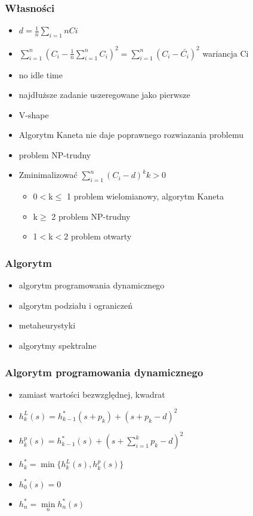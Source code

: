 \documentclass[12pt,a4paper]{article}
\begin{document}
\subsubsection{Własności}
\begin{itemize}
\item $d=\frac{1}{n}\sum\limits_{i=1}{n}Ci$
\item $\sum\limits_{i=1}^{n}(C_{i}-\frac{1}{n}\sum\limits_{i=1}^{n}C_{i})^2 = \sum\limits_{i=1}^{n}(C_{i}- \bar{C_{i}})^2$ wariancja Ci
\item no idle time
\item najdłuższe zadanie uszeregowane jako pierwsze
\item V-shape
\item Algorytm Kaneta nie daje poprawnego rozwiazania problemu
\item problem NP-trudny
\item Zminimalizować $\sum\limits_{i=1}^{n}(C_{i}-d)^k k>0$
\begin{itemize}
\item 0$<$k$\leq$ 1 problem wielomianowy, algorytm Kaneta
\item k$\geq$ 2 problem NP-trudny
\item 1$<$k$<$2 problem otwarty
\end{itemize}
\end{itemize}
\subsubsection{Algorytm}
\begin{itemize}
\item algorytm programowania dynamicznego
\item algorytm podziału i ograniczeń
\item metaheurystyki
\item algorytmy spektralne 
\end{itemize}
\subsubsection{Algorytm programowania dynamicznego}
\begin{itemize}
\item zamiast wartości bezwzględnej, kwadrat
\item $h_{k}^{L}(s)= h_{k-1}^{*}(s+p_{k})+(s+p_{k}-d)^2$
\item $h_{k}^{p}(s)=h_{k-1}^{*}(s)+(s+\sum\limits_{i=1}^{k}p_{k} -d)^2$
\item $h_{k}^{*}= \min\{h_{k}^{L}(s),h_{k}^{p}(s)\}$
\item $h_{0}^{*}(s)=0$
\item $h_{n}^{*}= \min\limits_{n} h_{n}^{*}(s)$
\end{itemize}
\end{document}
